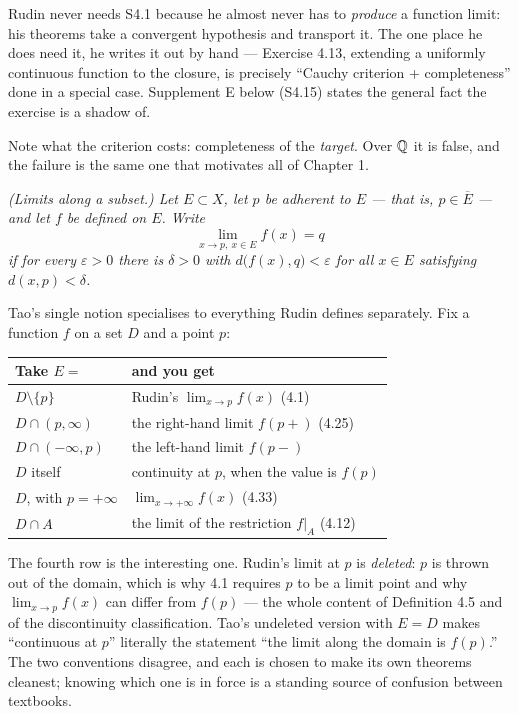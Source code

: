 \begin{deeper}
Rudin never needs S4.1 because he almost never has to \emph{produce} a
function limit: his theorems take a convergent hypothesis and transport it.
The one place he does need it, he writes it out by hand --- Exercise 4.13,
extending a uniformly continuous function to the closure, is precisely
``Cauchy criterion + completeness'' done in a special case. Supplement E
below (S4.15) states the general fact the exercise is a shadow of.

Note what the criterion costs: completeness of the \emph{target}. Over $\mathbb{Q}$
it is false, and the failure is the same one that motivates all of
Chapter 1.
\end{deeper}

\emph{(Limits along a subset.) Let $E \subset X$, let $p$ be adherent to $E$
--- that is, $p \in \overline E$ --- and let $f$ be defined on $E$. Write}
\[ \lim_{x\to p,\ x\in E} f(x) = q \]
\emph{if for every $\varepsilon>0$ there is $\delta>0$ with
$d\bigl(f(x),q\bigr) < \varepsilon$ for all $x \in E$ satisfying $d(x,p) <
\delta$.}

\begin{unpack}
Tao's single notion specialises to everything Rudin defines separately.
Fix a function $f$ on a set $D$ and a point $p$:

\smallskip
\begin{tabular}{@{}ll@{}}
\toprule
\textbf{Take $E =$} & \textbf{and you get} \\
\midrule
$D \setminus \{p\}$        & Rudin's $\lim_{x\to p} f(x)$ (4.1) \\
$D \cap (p,\infty)$        & the right-hand limit $f(p+)$ (4.25) \\
$D \cap (-\infty,p)$       & the left-hand limit $f(p-)$ \\
$D$ itself                 & continuity at $p$, when the value is $f(p)$ \\
$D$, with $p = +\infty$    & $\lim_{x\to+\infty} f(x)$ (4.33) \\
$D \cap A$                 & the limit of the restriction $f|_A$ (4.12) \\
\bottomrule
\end{tabular}

\smallskip
The fourth row is the interesting one. Rudin's limit at $p$ is
\emph{deleted}: $p$ is thrown out of the domain, which is why 4.1 requires
$p$ to be a limit point and why $\lim_{x\to p}f(x)$ can differ from $f(p)$
--- the whole content of Definition 4.5 and of the discontinuity
classification. Tao's undeleted version with $E = D$ makes ``continuous at
$p$'' literally the statement ``the limit along the domain is $f(p)$.'' The
two conventions disagree, and each is chosen to make its own theorems
cleanest; knowing which one is in force is a standing source of confusion
between textbooks.
\end{unpack}


